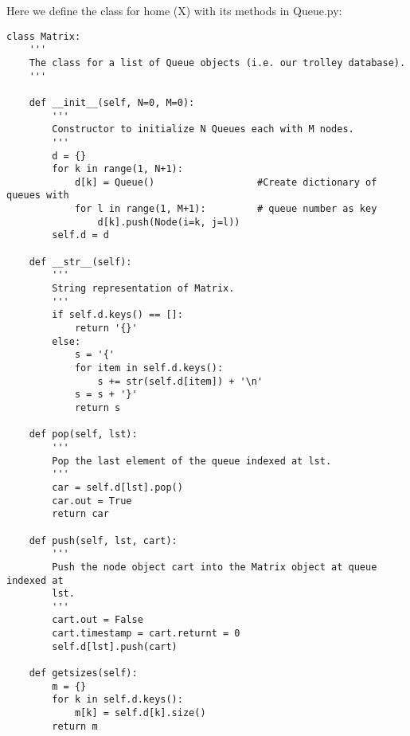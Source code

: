 \documentclass[english]{article}
\begin{document}
Here we define the class for home (X) with its methods in Queue.py:
\begin{singlespace}
\begin{verbatim}
class Matrix:
    '''
    The class for a list of Queue objects (i.e. our trolley database).
    '''
    
    def __init__(self, N=0, M=0):
        '''
        Constructor to initialize N Queues each with M nodes.
        '''
        d = {}
        for k in range(1, N+1):
            d[k] = Queue()                  #Create dictionary of queues with
            for l in range(1, M+1):         # queue number as key
                d[k].push(Node(i=k, j=l))
        self.d = d
    
    def __str__(self):
        '''
        String representation of Matrix.
        '''
        if self.d.keys() == []:
            return '{}'
        else:
            s = '{'
            for item in self.d.keys():
                s += str(self.d[item]) + '\n'
            s = s + '}'
            return s
    
    def pop(self, lst):
        '''
        Pop the last element of the queue indexed at lst.
        '''
        car = self.d[lst].pop()
        car.out = True
        return car

    def push(self, lst, cart):
        '''
        Push the node object cart into the Matrix object at queue indexed at
        lst.
        '''
        cart.out = False
        cart.timestamp = cart.returnt = 0
        self.d[lst].push(cart)
        
    def getsizes(self):
        m = {}
        for k in self.d.keys():
            m[k] = self.d[k].size()
        return m
\end{verbatim}
\end{singlespace}

\pagebreak
\end{document}
